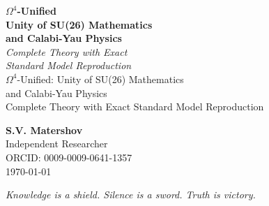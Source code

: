 \documentclass[12pt,a4paper,twoside]{article}
\theoremstyle{definition}
\begin{document}
\begin{titlepage}
\centering
\vspace*{0.5cm}


\vspace{0.8cm}

\begin{tcolorbox}[
  enhanced,
  colback=white,
  colframe=deepblue,
  boxrule=1.2pt,
  arc=6pt,
  left=14pt, right=14pt, top=14pt, bottom=14pt
]
\centering
{\Huge\bfseries\color{deepblue} $\Omega^4$-Unified}\\[0.3cm]
{\LARGE\bfseries Unity of SU(26) Mathematics\\[0.15cm] and Calabi-Yau Physics}\\[0.5cm]
{\large\itshape Complete Theory with Exact\\[0.1cm] Standard Model Reproduction}\\[0.4cm]
{\small\color{midgray} $\Omega^4$-Unified: Unity of SU(26) Mathematics\\[0.1cm] and Calabi-Yau Physics}\\[0.1cm]
{\small\color{midgray} Complete Theory with Exact Standard Model Reproduction}
\end{tcolorbox}

\vspace{1.2cm}

{\Large\bfseries\color{deepgray} S.V. Matershov}\\[0.3cm]
{\normalsize Independent Researcher}\\[0.15cm]
{\small\color{midgray} ORCID: 0009-0009-0641-1357}\\[0.15cm]
{\small\color{midgray} \today}

\vfill

\begin{tcolorbox}[
  enhanced,
  colback=lightgray,
  colframe=gold,
  boxrule=0.6pt,
  arc=3pt,
  width=0.85\textwidth,
  center
]
\centering\small\itshape\color{deepgray}
Knowledge is a shield. Silence is a sword. Truth is victory.
\end{tcolorbox}

\vspace{0.5cm}

\end{titlepage}
\end{document}
